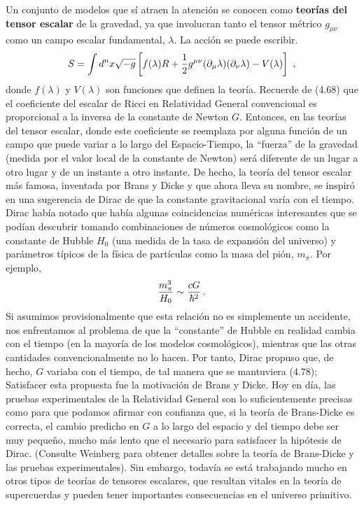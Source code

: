 \documentclass[11pt,b5paper,openany,twoside]{book}
\newcommand{\mn}{{\mu\nu}}
\newcommand{\p}[1]{{\partial_{#1}}}
\def\g{{\sqrt{-g}}}
\begin{document}
Un conjunto de modelos que sí atraen la atención se conocen como {\bf teorías del tensor escalar} de la gravedad, ya que involucran tanto el tensor métrico $g_\mn$ como un campo escalar fundamental, $\lambda$.
La acción se puede escribir.
\begin{equation}
S = \int d^nx \g \left[f(\lambda)R+{1\over 2}g^\mn(\p\mu\lambda)
(\p\nu\lambda) -V(\lambda)\right]\ ,\label{4.77}
\end{equation}
donde $f(\lambda)$ y $V(\lambda)$ son funciones que definen la teoría.
Recuerde de (4.68) que el coeficiente del escalar de Ricci en Relatividad General convencional es proporcional a la inversa de la constante de Newton $G$.
Entonces, en las teorías del tensor escalar, donde este coeficiente se reemplaza por alguna función de un campo que puede variar a lo largo del Espacio-Tiempo, la ``fuerza'' de la gravedad (medida por el valor local de la constante de Newton) será diferente de un lugar a otro lugar y de un instante a otro instante.
De hecho, la teoría del tensor escalar más famosa, inventada por Brans y Dicke y que ahora lleva su nombre, se inspiró en una sugerencia de Dirac de que la constante gravitacional varía con el tiempo.
Dirac había notado que había algunas coincidencias numéricas interesantes que se podían descubrir tomando combinaciones de números cosmológicos como la constante de Hubble $H_0$ (una medida de la tasa de expansión del universo) y parámetros típicos de la física de partículas como la masa del pión, $m_\pi$.
Por ejemplo,
\begin{equation}
{{m_\pi^3}\over{H_0}}\sim {{cG}\over{\hbar^2}}\,.\label{4.78}
\end{equation}
Si asumimos provisionalmente que esta relación no es simplemente un accidente, nos enfrentamos al problema de que la ``constante'' de Hubble en realidad cambia con el tiempo (en la mayoría de los modelos cosmológicos), mientras que las otras cantidades convencionalmente no lo hacen.
Por tanto, Dirac propuso que, de hecho, $G$ variaba con el tiempo, de tal manera que se mantuviera (4.78); Satisfacer esta propuesta fue la motivación de Brans y Dicke.
Hoy en día, las pruebas experimentales de la Relatividad General son lo suficientemente precisas como para que podamos afirmar con confianza que, si la teoría de Brans-Dicke es correcta, el cambio predicho en $G$ a lo largo del espacio y del tiempo debe ser muy pequeño, mucho más lento que el necesario para satisfacer la hipótesis de Dirac.
(Consulte Weinberg para obtener detalles sobre la teoría de Brans-Dicke y las pruebas experimentales).
Sin embargo, todavía se está trabajando mucho en otros tipos de teorías de tensores escalares, que resultan vitales en la teoría de supercuerdas y pueden tener importantes consecuencias en el universo primitivo.
\end{document}
